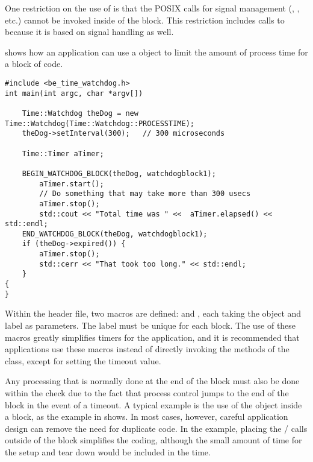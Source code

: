 One restriction on the use of  is that the POSIX calls for
signal management (, , etc.) cannot be
invoked inside of the  block. This restriction includes calls to
 because it is based on signal handling as well.

 shows how an application can use a 
object to limit the amount of process time for a block of code.

\begin{lstlisting}[caption={Using the \class{Watchdog}}, label=lst:watchdoguse]
#include <be_time_watchdog.h>
int main(int argc, char *argv[])

    Time::Watchdog theDog = new Time::Watchdog(Time::Watchdog::PROCESSTIME);
    theDog->setInterval(300);	// 300 microseconds

    Time::Timer aTimer;

    BEGIN_WATCHDOG_BLOCK(theDog, watchdogblock1);
        aTimer.start();
        // Do something that may take more than 300 usecs
        aTimer.stop();
        std::cout << "Total time was " <<  aTimer.elapsed() << std::endl;
    END_WATCHDOG_BLOCK(theDog, watchdogblock1);
    if (theDog->expired()) {
        aTimer.stop();
        std::cerr << "That took too long." << std::endl;
    }
{
}
\end{lstlisting}

Within the  header file, two macros are defined:
 and , each taking
the  object and label as parameters. The label must be unique
for each  block.  The use of these macros greatly simplifies
 timers for the application, and it is recommended that applications
use these macros instead of directly invoking the methods of the
 class, except for setting the timeout value.

Any processing that is normally done at the end of the  block must also
be done within the  check
due to the fact that process control jumps to the end of the  block
in the event of a timeout.
A typical example is the use of the 
object inside a  block, as the example in 
shows. In most cases, however, careful application design can remove the need
for duplicate code. In the example, placing the  / calls
outside of the  block simplifies the coding, although the small amount
of time for the  setup and tear down would be included in the time.
